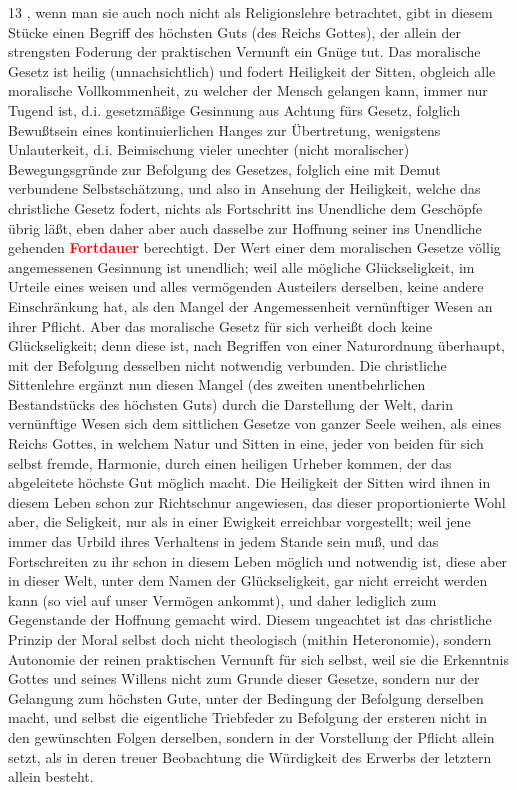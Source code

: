\documentclass[a4paper,12pt,twoside]{book}
\newcommand{\match}[1]{\textcolor{red}{\textbf{#1}}}
\begin{document}
	
	13
	, wenn man sie auch noch nicht als Religionslehre betrachtet, gibt in diesem Stücke  einen Begriff des höchsten Guts (des Reichs Gottes), der allein der strengsten Foderung der praktischen Vernunft ein Gnüge tut. Das moralische Gesetz ist heilig (unnachsichtlich) und fodert Heiligkeit der Sitten, obgleich alle moralische Vollkommenheit, zu welcher der Mensch gelangen kann, immer nur Tugend ist, d.i. gesetzmäßige Gesinnung aus Achtung fürs Gesetz, folglich Bewußtsein eines kontinuierlichen Hanges zur Übertretung, wenigstens Unlauterkeit, d.i. Beimischung vieler unechter (nicht moralischer) Bewegungsgründe zur Befolgung des Gesetzes, folglich eine mit Demut verbundene Selbstschätzung, und also in Ansehung der Heiligkeit, welche das christliche Gesetz fodert, nichts als Fortschritt ins Unendliche dem Geschöpfe  übrig läßt, eben daher aber auch dasselbe zur Hoffnung seiner ins Unendliche gehenden \match{Fortdauer} berechtigt. Der Wert einer dem moralischen Gesetze völlig angemessenen Gesinnung ist unendlich; weil alle mögliche Glückseligkeit, im Urteile eines weisen und alles vermögenden Austeilers derselben, keine andere Einschränkung hat, als den Mangel der Angemessenheit vernünftiger Wesen an ihrer Pflicht. Aber das moralische Gesetz für sich verheißt doch keine Glückseligkeit; denn diese ist, nach Begriffen von einer Naturordnung überhaupt, mit der Befolgung desselben nicht notwendig verbunden. Die christliche Sittenlehre ergänzt nun diesen Mangel (des zweiten unentbehrlichen Bestandstücks des höchsten Guts) durch die Darstellung der Welt, darin vernünftige Wesen sich dem sittlichen Gesetze von ganzer Seele weihen, als eines Reichs Gottes, in welchem Natur und Sitten in eine, jeder von beiden für sich selbst fremde, Harmonie, durch einen heiligen Urheber kommen, der das abgeleitete höchste Gut möglich macht. Die Heiligkeit der Sitten wird ihnen in diesem Leben schon zur Richtschnur angewiesen, das dieser proportionierte Wohl aber, die Seligkeit, nur als in einer Ewigkeit erreichbar vorgestellt; weil jene immer das Urbild ihres Verhaltens in jedem Stande sein muß, und das Fortschreiten zu ihr schon in diesem Leben möglich und notwendig ist, diese aber in dieser Welt, unter dem Namen der Glückseligkeit, gar nicht erreicht werden kann (so viel auf unser Vermögen ankommt), und daher lediglich zum Gegenstande der Hoffnung gemacht wird. Diesem ungeachtet ist das christliche Prinzip der Moral selbst doch nicht theologisch (mithin Heteronomie), sondern Autonomie der reinen praktischen Vernunft für sich selbst, weil sie die Erkenntnis Gottes und seines Willens nicht zum Grunde dieser Gesetze, sondern nur der Gelangung zum höchsten Gute, unter der Bedingung der Befolgung derselben macht, und selbst die eigentliche Triebfeder zu Befolgung der ersteren nicht in den gewünschten Folgen derselben, sondern in der Vorstellung der Pflicht allein setzt, als in deren treuer Beobachtung die Würdigkeit des Erwerbs der letztern allein besteht. 
	
\end{document}
